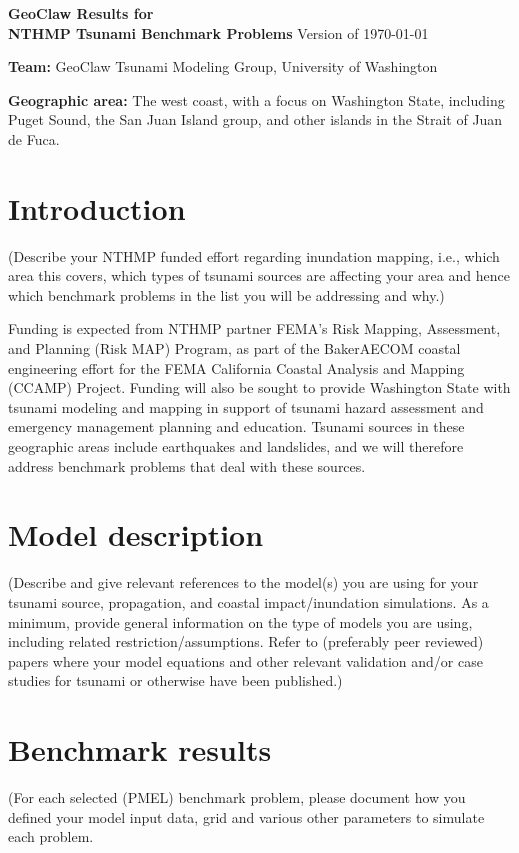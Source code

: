 \documentclass[11pt]{article}
\begin{document}
\begin{center}
{{\Large\bf
GeoClaw Results for \\
NTHMP Tsunami Benchmark Problems}
\vskip 5pt
Version of \today}
\end{center}


\vskip 15pt
\noindent
{\bf Team:}  GeoClaw Tsunami Modeling Group, University of Washington

\vskip 5pt
\noindent
{\bf Geographic area:}  The west coast, with a focus on Washington State,
including Puget Sound, the San Juan Island group, and other islands in the
Strait of Juan de Fuca.

\vskip 5pt
\section{Introduction}

(Describe your NTHMP funded effort regarding inundation mapping, i.e., which
area this covers, which types of tsunami sources are affecting your area and
hence which benchmark problems in the list you will be addressing and why.)

Funding is expected from NTHMP partner FEMA’s Risk Mapping, Assessment, and
Planning (Risk MAP) Program, as part of the BakerAECOM coastal engineering
effort for the FEMA California Coastal Analysis and Mapping (CCAMP) Project.
Funding will also be sought to provide Washington State with tsunami
modeling and mapping in support of tsunami hazard assessment and emergency
management planning and education.  Tsunami sources in these geographic
areas include earthquakes and landslides, and we will therefore address
benchmark problems that deal with these sources.

\section{Model description}
(Describe and give relevant references to the model(s) you are using for
your tsunami source, propagation, and coastal impact/inundation simulations.
As a minimum, provide general information on the type of models you are
using, including related restriction/assumptions. Refer to (preferably peer
reviewed) papers where your model equations and other relevant validation
and/or case studies for tsunami or otherwise have been published.)

\section{Benchmark results}
(For each selected (PMEL) benchmark problem, please document how you defined
your model input data, grid and various other parameters to simulate each
problem. 
\end{document}
